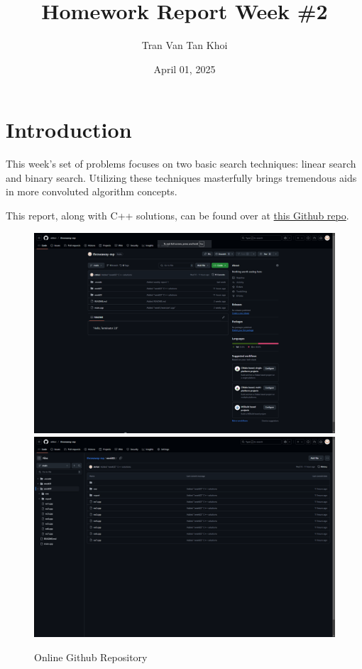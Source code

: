 \documentclass{article}
\author{Tran Van Tan Khoi}
\title{Homework Report Week \#2}
\date{April 01, 2025}
\begin{document}
    \maketitle

    \section{Introduction}
    
    This week's set of problems focuses on two basic search techniques: linear search and binary search. Utilizing these techniques masterfully brings tremendous aids in more convoluted algorithm concepts.


    This report, along with C++ solutions, can be found over at \href{https://github.com/xtrkoi/throwaway-rep}{this Github repo}.

    \begin{figure}[!h]
        \centering
        \includegraphics[width=12cm]{figure01.png}\hfil
        \includegraphics[width=12cm]{figure02.png}
        \caption{Online Github Repository}
    \end{figure}
\end{document}
